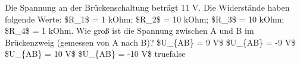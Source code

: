     {Die Spannung an der Brückenschaltung beträgt 11 V. Die Widerstände haben folgende Werte: \$R\_1\$ = 1 kOhm; \$R\_2\$ = 10 kOhm; \$R\_3\$ = 10 kOhm; \$R\_4\$ = 1 kOhm. Wie groß ist die Spannung zwischen A und B im Brückenzweig (gemessen von A nach B)?}
    {\$U\_\{AB\} = 9 V\$ }
    {\$U\_\{AB\} = -9 V\$}
    {\$U\_\{AB\} = 10 V\$}
    {\$U\_\{AB\} = -10 V\$}
    {true}{false}